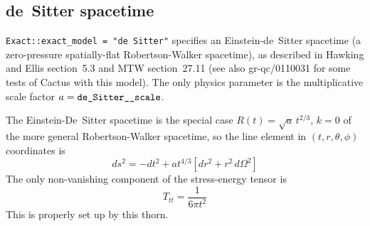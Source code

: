 
\subsection{de~Sitter spacetime}

\verb|Exact::exact_model = "de Sitter"| specifies an Einstein-de~Sitter 
spacetime (a zero-pressure spatially-flat Robertson-Walker spacetime),
as described in Hawking and Ellis section~5.3 and MTW section~27.11
(see also gr-qc/0110031 for some tests of Cactus with this model).
The only physics parameter is the multiplicative scale
factor $a = \verb|de_Sitter__scale|$.

The Einstein-De~Sitter spacetime is the special case
$R(t) = \sqrt{a}\,t^{2/3}$, $k = 0$ of the more general Robertson-Walker
spacetime, so the line element in $(t,r,\theta,\phi)$ coordinates is
\begin{equation}
ds^2 = -dt^2 + a t^{4/3} \left[ dr^2 + r^2 \, d\Omega^2 \right]
\end{equation}
The only non-vanishing component of the stress-energy tensor is
\begin{equation}
T_{tt} = \frac{1}{6 \pi t^2}
\end{equation}
This is properly set up by this thorn. 

